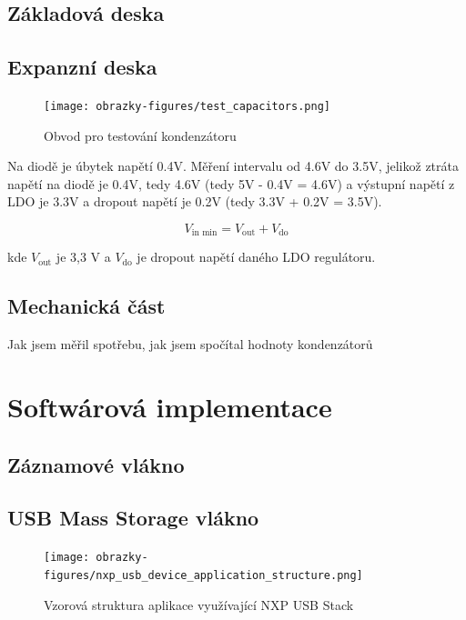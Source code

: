 \section{Základová deska}

\section{Expanzní deska}

\begin{figure}[h]
    \centering
    \texttt{[image: obrazky-figures/test\_capacitors.png]}
    
    \caption{Obvod pro testování kondenzátoru}
    \label{fig:test-capacitors}
\end{figure}

Na diodě je úbytek napětí 0.4V. Měření intervalu od 4.6V do 3.5V, jelikož ztráta napětí na diodě je 0.4V, tedy 4.6V (tedy 5V - 0.4V = 4.6V) a výstupní napětí z LDO je 3.3V a dropout napětí je 0.2V (tedy 3.3V + 0.2V = 3.5V).

\[
V_{\text{in min}} = V_{\text{out}} + V_{\text{do}}
\]

kde \(V_{\text{out}}\) je 3,3 V a \(V_{\text{do}}\) je dropout napětí daného LDO regulátoru.


\section{Mechanická část}
Jak jsem měřil spotřebu, jak jsem spočítal hodnoty kondenzátorů

\chapter{Softwárová implementace}

\section{Záznamové vlákno}

\section{USB Mass Storage vlákno}

\begin{figure}[h]
    \centering
    \texttt{[image: obrazky-figures/nxp\_usb\_device\_application\_structure.png]}
    
    \caption{Vzorová struktura aplikace využívající NXP USB Stack \cite{silicon_labs_mass_storage_protocol}}
    \label{fig:usb-device-app-structure}
\end{figure}


